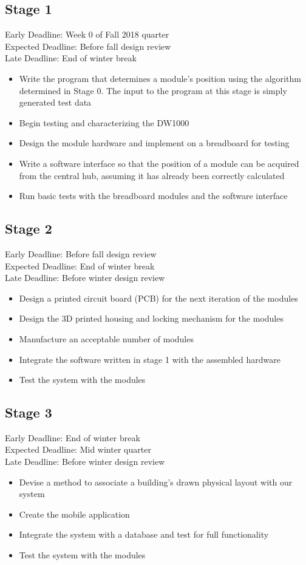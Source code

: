 \documentclass{article}
\begin{document}
\subsection{Stage 1}
Early Deadline: Week 0 of Fall 2018 quarter \\
Expected Deadline: Before fall design review \\
Late Deadline: End of winter break \\
\begin{itemize}
\item Write the program that determines a module's position using the algorithm determined in Stage 0. The input to the program at this stage is simply generated test data
\item Begin testing and characterizing the DW1000
\item Design the module hardware and implement on a breadboard for testing
\item Write a software interface so that the position of a module can be acquired from the central hub, assuming it has already been correctly calculated
\item Run basic tests with the breadboard modules and the software interface
\end{itemize}

\subsection{Stage 2}
Early Deadline: Before fall design review \\
Expected Deadline: End of winter break \\
Late Deadline: Before winter design review \\
\begin{itemize}
\item Design a printed circuit board (PCB) for the next iteration of the modules
\item Design the 3D printed housing and locking mechanism for the modules
\item Manufacture an acceptable number of modules
\item Integrate the software written in stage 1 with the assembled hardware
\item Test the system with the modules
\end{itemize}

\subsection{Stage 3}
Early Deadline: End of winter break \\
Expected Deadline: Mid winter quarter \\
Late Deadline: Before winter design review \\
\begin{itemize}
\item Devise a method to associate a building's drawn physical layout with our system
\item Create the mobile application
\item Integrate the system with a database and test for full functionality
\item Test the system with the modules
\end{itemize}
\end{document}
